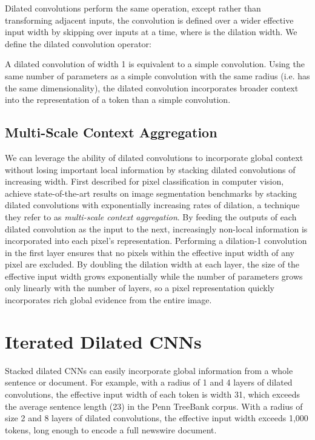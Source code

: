 \documentclass[11pt,letterpaper]{article}
\begin{document}
Dilated convolutions perform the same operation, except rather than transforming adjacent inputs, the convolution is defined over a wider effective input width by skipping over  inputs at a time, where  is the dilation width. We define the dilated convolution operator:

A dilated convolution of width 1 is equivalent to a simple convolution. Using the same number of parameters as a simple convolution with the same radius (i.e.  has the same dimensionality), the  dilated convolution incorporates broader context into the representation of a token than a simple convolution. 



\subsection{Multi-Scale Context Aggregation}



We can leverage the ability of dilated convolutions to incorporate global context without losing important local information by stacking dilated convolutions of increasing width. First described for pixel classification in computer vision, \citet{yu2015multi} achieve state-of-the-art results on image segmentation benchmarks by stacking dilated convolutions with exponentially increasing rates of dilation, a technique they refer to as \emph{multi-scale context aggregation}. By feeding the outputs of each dilated convolution as the input to the next, increasingly non-local information is incorporated into each pixel's representation. Performing a dilation-1 convolution in the first layer ensures that no pixels within the effective input width of any pixel are excluded. By doubling the dilation width at each layer, the size of the effective input width grows exponentially while the number of parameters grows only linearly with the number of layers, so a pixel representation quickly incorporates rich global evidence from the entire image.  
\section{Iterated Dilated CNNs}
\label{blocks-section}
Stacked dilated CNNs can easily incorporate global information from a whole sentence or document. For example, with a radius of 1 and 4 layers of dilated convolutions, the effective input width of each token is width 31, which exceeds the average sentence length (23) in the Penn TreeBank corpus. With a radius of size 2 and 8 layers of dilated convolutions, the effective input width exceeds 1,000 tokens, long enough to encode a full newswire document.
\end{document}
